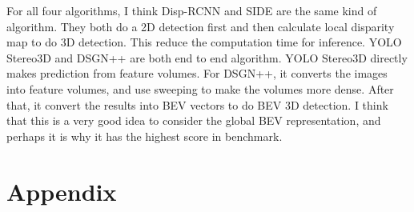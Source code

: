 \documentclass[12pt]{article}
\begin{document}
For all four algorithms, I think Disp-RCNN and SIDE are the same kind of algorithm. They both do a 2D detection first and then calculate local disparity map to do 3D detection. This reduce the computation time for inference. YOLO Stereo3D and DSGN++ are both end to end algorithm. YOLO Stereo3D directly makes prediction from feature volumes. For DSGN++, it converts the images into feature volumes, and use sweeping to make the volumes more dense. After that, it convert the results into BEV vectors to do BEV 3D detection. I think that this is a very good idea to consider the global BEV representation, and perhaps it is why it has the highest score in benchmark.
\newpage
\nocite{*}
%

%

\newpage
\part{Appendix}

\end{document}
